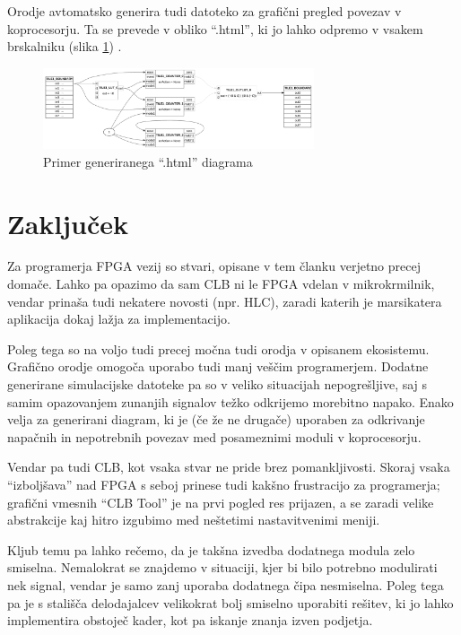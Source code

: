 \documentclass[a4paper]{article}
\begin{document}
\begin{sloppypar}
Orodje avtomatsko generira tudi datoteko za grafični pregled povezav v
koprocesorju. Ta se prevede v obliko ``.html'', ki jo lahko odpremo v vsakem
brskalniku (slika \ref{fig:clbtool_diagram}) \cite[Pogl.~1]{clb-user-guide}.

\begin{figure}[htb]
    \centerline{\includegraphics[width=8cm]{html_diagram}}
    \caption{Primer generiranega ``.html'' diagrama}
    \label{fig:clbtool_diagram} 
\end{figure} 


\section{Zaključek}
Za programerja FPGA vezij so stvari, opisane v tem članku verjetno precej
domače. Lahko pa opazimo da sam CLB ni le FPGA vdelan v mikrokrmilnik, vendar
prinaša tudi nekatere novosti (npr. HLC), zaradi katerih je marsikatera
aplikacija dokaj lažja za implementacijo.

Poleg tega so na voljo tudi precej močna tudi orodja v opisanem ekosistemu.
Grafično orodje omogoča uporabo tudi manj veščim programerjem. Dodatne
generirane simulacijske datoteke pa so v veliko situacijah nepogrešljive, saj s
samim opazovanjem zunanjih signalov težko odkrijemo morebitno napako. Enako
velja za generirani diagram, ki je (če že ne drugače) uporaben za odkrivanje
napačnih in nepotrebnih povezav med posameznimi moduli v koprocesorju.

Vendar pa tudi CLB, kot vsaka stvar ne pride brez pomankljivosti. Skoraj vsaka
``izboljšava'' nad FPGA s seboj prinese tudi kakšno frustracijo za programerja;
grafični vmesnih ``CLB Tool'' je na prvi pogled res prijazen, a se zaradi
velike abstrakcije kaj hitro izgubimo med neštetimi nastavitvenimi meniji.

Kljub temu pa lahko rečemo, da je takšna izvedba dodatnega modula zelo
smiselna. Nemalokrat se znajdemo v situaciji, kjer bi bilo potrebno modulirati
nek signal, vendar je samo zanj uporaba dodatnega čipa nesmiselna. Poleg tega
pa je s stališča delodajalcev velikokrat bolj smiselno uporabiti rešitev, ki jo
lahko implementira obstoječ kader, kot pa iskanje znanja izven podjetja.


\printbibliography


\end{sloppypar}
\end{document}
